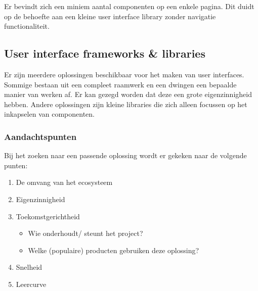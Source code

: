 Er bevindt zich een miniem aantal componenten op een enkele pagina. Dit duidt op de behoefte aan een kleine user interface library zonder navigatie functionaliteit.



\clearpage
\subsection{User interface frameworks \& libraries}
Er zijn meerdere oplossingen beschikbaar voor het maken van user interfaces. Sommige bestaan uit een compleet raamwerk en een dwingen een bepaalde manier van werken af. Er kan gezegd worden dat deze een grote eigenzinnigheid hebben. Andere oplossingen zijn kleine libraries die zich alleen focussen op het inkapselen van componenten.

\subsubsection{Aandachtspunten}
Bij het zoeken naar een passende oplossing wordt er gekeken naar de volgende punten:
\begin{enumerate}
    \item De omvang van het ecosysteem
    \item Eigenzinnigheid
    \item Toekomstgerichtheid
    \begin{itemize}
        \item Wie onderhoudt/ steunt het project?
        \item Welke (populaire) producten gebruiken deze oplossing?
    \end{itemize}
    \item Snelheid
    \item Leercurve    
\end{enumerate}


